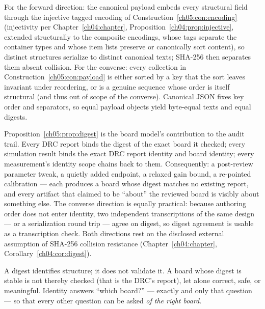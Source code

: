 \begin{designargument}
For the forward direction: the canonical payload embeds every structural
field through the injective tagged encoding of
Construction~\ref{ch05:con:encoding} (injectivity per
Chapter~\ref{ch04:chapter}, Proposition~\ref{ch04:prop:injective},
extended structurally to the composite encodings, whose tags separate the
container types and whose item lists preserve or canonically sort
content), so distinct structures serialize to distinct canonical texts;
SHA-256 then separates them absent collision. For the converse: every
collection in Construction~\ref{ch05:con:payload} is either sorted by a
key that the sort leaves invariant under reordering, or is a genuine
sequence whose order is itself structural (and thus out of scope of the
converse). Canonical JSON fixes key order and separators, so equal
payload objects yield byte-equal texts and equal digests.
\end{designargument}

\begin{remark}\label{ch05:rem:evidence}
Proposition~\ref{ch05:prop:digest} is the board model's contribution to
the audit trail. Every DRC report binds the digest of the exact board it
checked; every simulation result binds the exact DRC report identity and
board identity; every measurement's identity scope chains back to them.
Consequently: a post-review parameter tweak, a quietly added endpoint, a
relaxed gain bound, a re-pointed calibration --- each produces a board
whose digest matches no existing report, and every artifact that claimed
to be ``about'' the reviewed board is visibly about something else. The
converse direction is equally practical: because authoring order does not
enter identity, two independent transcriptions of the same design ---
or a serialization round trip --- agree on digest, so digest agreement is
usable as a transcription check. Both directions rest on the disclosed
external assumption of SHA-256 collision resistance
(Chapter~\ref{ch04:chapter}, Corollary~\ref{ch04:cor:digest}).
\end{remark}

\begin{remark}
A digest identifies structure; it does not validate it. A board whose
digest is stable is not thereby checked (that is the DRC's report), let
alone correct, safe, or meaningful. Identity answers ``which board?'' ---
exactly and only that question --- so that every other question can be
asked \emph{of the right board}.
\end{remark}

